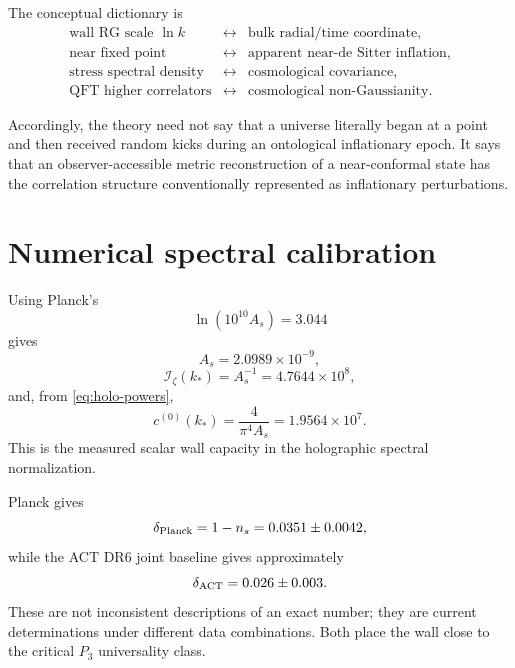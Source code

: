 \documentclass[11pt]{article}
\numberwithin{equation}{section}
\newcommand{\Iz}{\mathcal I_\zeta}
\newcommand{\cz}{c^{(0)}}
\begin{document}
The conceptual dictionary is
\begin{equation}
\boxed{
\begin{array}{ccl}
\text{wall RG scale }\ln k&\leftrightarrow&\text{bulk radial/time coordinate},\\
\text{near fixed point}&\leftrightarrow&\text{apparent near-de Sitter inflation},\\
\text{stress spectral density}&\leftrightarrow&\text{cosmological covariance},\\
\text{QFT higher correlators}&\leftrightarrow&\text{cosmological non-Gaussianity}.
\end{array}}
\end{equation}

Accordingly, the theory need not say that a universe literally began at a point and then received random kicks during an ontological inflationary epoch. It says that an observer-accessible metric reconstruction of a near-conformal state has the correlation structure conventionally represented as inflationary perturbations.

\section{Numerical spectral calibration}

Using Planck's
\begin{equation}
\ln(10^{10}A_s)=3.044
\end{equation}
gives
\begin{equation}
\boxed{A_s=2.0989\times10^{-9},}
\end{equation}
\begin{equation}
\boxed{\Iz(k_*)=A_s^{-1}=4.7644\times10^8,}
\end{equation}
and, from \cref{eq:holo-powers},
\begin{equation}
\boxed{\cz(k_*)=\frac{4}{\pi^4A_s}=1.9564\times10^7.}
\end{equation}
This is the measured scalar wall capacity in the holographic spectral normalization.

Planck gives
\begin{equation}
\delta_{\rm Planck}=1-n_s=0.0351\pm0.0042,
\end{equation}
while the ACT DR6 joint baseline gives approximately
\begin{equation}
\delta_{\rm ACT}=0.026\pm0.003.
\end{equation}
These are not inconsistent descriptions of an exact number; they are current determinations under different data combinations. Both place the wall close to the critical $P_3$ universality class.
\end{document}
